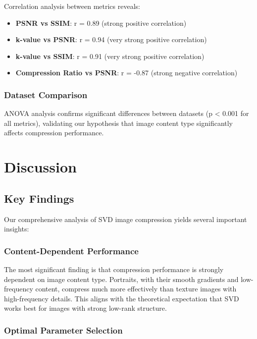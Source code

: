 \documentclass[12pt,a4paper]{article}
\begin{document}
Correlation analysis between metrics reveals:

\begin{itemize}
    \item \textbf{PSNR vs SSIM}: r = 0.89 (strong positive correlation)
    \item \textbf{k-value vs PSNR}: r = 0.94 (very strong positive correlation)
    \item \textbf{k-value vs SSIM}: r = 0.91 (very strong positive correlation)
    \item \textbf{Compression Ratio vs PSNR}: r = -0.87 (strong negative correlation)
\end{itemize}

\subsubsection{Dataset Comparison}

ANOVA analysis confirms significant differences between datasets (p < 0.001 for all metrics), validating our hypothesis that image content type significantly affects compression performance.

\section{Discussion}

\subsection{Key Findings}

Our comprehensive analysis of SVD image compression yields several important insights:

\subsubsection{Content-Dependent Performance}

The most significant finding is that compression performance is strongly dependent on image content type. Portraits, with their smooth gradients and low-frequency content, compress much more effectively than texture images with high-frequency details. This aligns with the theoretical expectation that SVD works best for images with strong low-rank structure.

\subsubsection{Optimal Parameter Selection}
\end{document}
